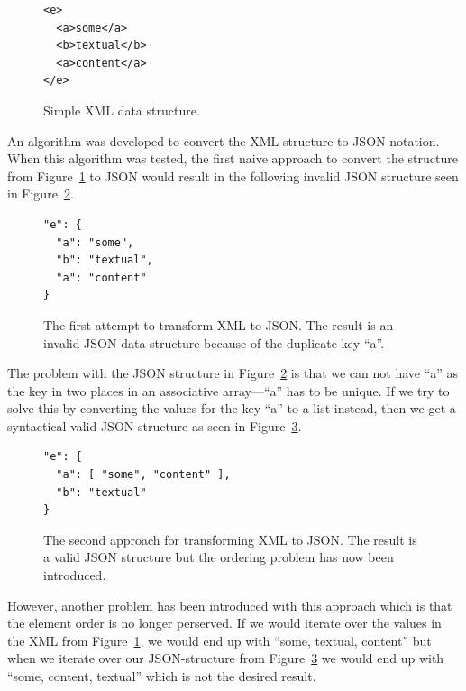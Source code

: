 \documentclass{cslthse-msc}
\begin{document}
\begin{appendices}
\begin{figure}[H]
  \centering
    \begin{center}
\begin{lstlisting}[breaklines=true,frame=single]
<e>
  <a>some</a>
  <b>textual</b>
  <a>content</a>
</e>
\end{lstlisting}
    \end{center}
  \caption{Simple XML data structure.}
  \label{fig:xml_structure}
\end{figure}

An algorithm was developed to convert the XML-structure to JSON notation. When this algorithm was tested, the first naive approach to convert the structure from Figure~\ref{fig:xml_structure} to JSON would result in the following invalid JSON structure seen in Figure~\ref{fig:xml_wrong}.

\begin{figure}[H]
  \centering
    \begin{center}
\begin{lstlisting}[breaklines=true,frame=single]
"e": {
  "a": "some",
  "b": "textual",
  "a": "content"
}
\end{lstlisting}
    \end{center}
  \caption{The first attempt to transform XML to JSON. The result is an invalid JSON data structure because of the duplicate key \enquote{a}.}
  \label{fig:xml_wrong}
\end{figure}

The problem with the JSON structure in Figure~\ref{fig:xml_wrong} is that we can not have \enquote{a} as the key in two places in an associative array---\enquote{a} has to be unique. If we try to solve this by converting the values for the key \enquote{a} to a list instead, then we get a syntactical valid JSON structure as seen in Figure~\ref{fig:json_wrong}.

\begin{figure}[H]
  \centering
    \begin{center}
\begin{lstlisting}[breaklines=true,frame=single]
"e": {
  "a": [ "some", "content" ],
  "b": "textual"
}
\end{lstlisting}
    \end{center}
  \caption{The second approach for transforming XML to JSON. The result is a valid JSON structure but the ordering problem has now been introduced.}
  \label{fig:json_wrong}
\end{figure}

However, another problem has been introduced with this approach which is that the element order is no longer perserved. If we would iterate over the values in the XML from Figure~\ref{fig:xml_structure}, we would end up with \enquote{some, textual, content} but when we iterate over our JSON-structure from Figure~\ref{fig:json_wrong} we would end up with \enquote{some, content, textual} which is not the desired result.


\end{appendices}
\end{document}
